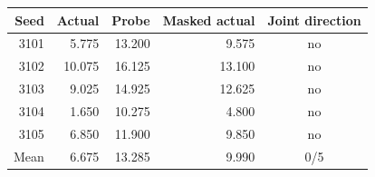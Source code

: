 \begin{tabular}{rrrrc}
\toprule
Seed & Actual & Probe & Masked actual & Joint direction \\
\midrule
3101 & 5.775 & 13.200 & 9.575 & no \\
3102 & 10.075 & 16.125 & 13.100 & no \\
3103 & 9.025 & 14.925 & 12.625 & no \\
3104 & 1.650 & 10.275 & 4.800 & no \\
3105 & 6.850 & 11.900 & 9.850 & no \\
\midrule
Mean & 6.675 & 13.285 & 9.990 & 0/5 \\
\bottomrule
\end{tabular}
